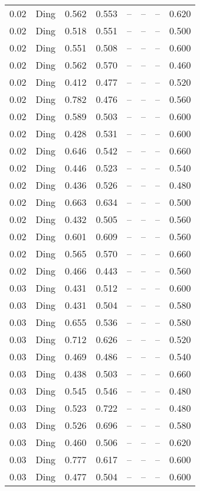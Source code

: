 \begin{table}[H]
\begin{tabular}{l c l l l}
0.02 & Ding & 0.562 & 0.553 & -- & -- & -- & 0.620 \\
0.02 & Ding & 0.518 & 0.551 & -- & -- & -- & 0.500 \\
0.02 & Ding & 0.551 & 0.508 & -- & -- & -- & 0.600 \\
0.02 & Ding & 0.562 & 0.570 & -- & -- & -- & 0.460 \\
0.02 & Ding & 0.412 & 0.477 & -- & -- & -- & 0.520 \\
0.02 & Ding & 0.782 & 0.476 & -- & -- & -- & 0.560 \\
0.02 & Ding & 0.589 & 0.503 & -- & -- & -- & 0.600 \\
0.02 & Ding & 0.428 & 0.531 & -- & -- & -- & 0.600 \\
0.02 & Ding & 0.646 & 0.542 & -- & -- & -- & 0.660 \\
0.02 & Ding & 0.446 & 0.523 & -- & -- & -- & 0.540 \\
0.02 & Ding & 0.436 & 0.526 & -- & -- & -- & 0.480 \\
0.02 & Ding & 0.663 & 0.634 & -- & -- & -- & 0.500 \\
0.02 & Ding & 0.432 & 0.505 & -- & -- & -- & 0.560 \\
0.02 & Ding & 0.601 & 0.609 & -- & -- & -- & 0.560 \\
0.02 & Ding & 0.565 & 0.570 & -- & -- & -- & 0.660 \\
0.02 & Ding & 0.466 & 0.443 & -- & -- & -- & 0.560 \\
0.03 & Ding & 0.431 & 0.512 & -- & -- & -- & 0.600 \\
0.03 & Ding & 0.431 & 0.504 & -- & -- & -- & 0.580 \\
0.03 & Ding & 0.655 & 0.536 & -- & -- & -- & 0.580 \\
0.03 & Ding & 0.712 & 0.626 & -- & -- & -- & 0.520 \\
0.03 & Ding & 0.469 & 0.486 & -- & -- & -- & 0.540 \\
0.03 & Ding & 0.438 & 0.503 & -- & -- & -- & 0.660 \\
0.03 & Ding & 0.545 & 0.546 & -- & -- & -- & 0.480 \\
0.03 & Ding & 0.523 & 0.722 & -- & -- & -- & 0.480 \\
0.03 & Ding & 0.526 & 0.696 & -- & -- & -- & 0.580 \\
0.03 & Ding & 0.460 & 0.506 & -- & -- & -- & 0.620 \\
0.03 & Ding & 0.777 & 0.617 & -- & -- & -- & 0.600 \\
0.03 & Ding & 0.477 & 0.504 & -- & -- & -- & 0.600 \\

\end{tabular}
\end{table}
